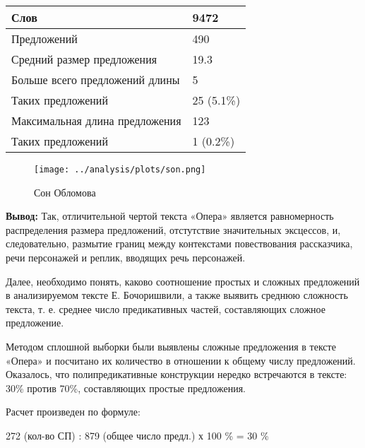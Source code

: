 \documentclass{kursa4}
\begin{document}
{        \begin{center}
          \tablehead{}
          \begin{tabular}{|m{5.7730002cm}|m{1.6559999cm}|}
            \hline
            Слов &
            9472\\\hline
            Предложений &
            490\\\hline
            Средний размер предложения &
            19.3\\\hline
            Больше всего предложений длины &
            5\\\hline
            Таких предложений &
            25 (5.1\%)\\\hline
            Максимальная длина предложения &
            123\\\hline
            Таких предложений &
            1 (0.2\%)\\\hline
            \end{tabular}
          \end{center}
        
        \begin{figure}[htbp]
          \centering
          \texttt{[image: ../analysis/plots/son.png]}
          \caption{Сон Обломова}
        \end{figure}

        \textbf{Вывод:} Так, отличительной чертой текста «Опера» является равномерность распределения размера предложений, отстутствие значительных эксцессов, и, следовательно, размытие границ между контекстами повествования рассказчика, речи персонажей и реплик, вводящих речь персонажей. 

        Далее, необходимо понять, каково соотношение простых и сложных предложений в анализируемом тексте Е. Бочоришвили, а также выявить среднюю сложность текста, т. е. среднее число предикативных частей, составляющих сложное предложение.
        
        Методом сплошной выборки были выявлены сложные предложения в тексте «Опера» и посчитано их количество в отношении к общему числу предложений. Оказалось, что полипредикативные конструкции нередко встречаются в тексте: 30\% против 70\%, составляющих простые предложения.

        Расчет произведен по формуле: 

        {\centering
        {272 (кол-во СП) : 879 (общее число предл.) х 100 \% =
        30 \%}
        \par}

}
\end{document}
